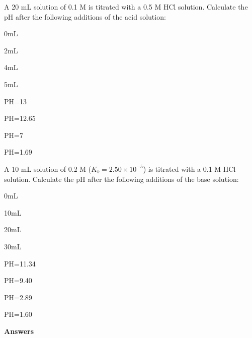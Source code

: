 \documentclass[main.tex]{subfiles}
\begin{document}
\begin{multicols*}{2}
\begin{question}[ID=\the\value{numA}]
A 20 mL solution of 0.1 M  is titrated with a 0.5 M HCl solution. Calculate the pH after the following additions of the acid solution: 
\begin{inparaenum}[(a)]
\item  0mL  	%
\item  2mL		%
\item  4mL		%
\item  5mL		%
 \end{inparaenum}
\end{question}
\begin{solution}
\begin{inparaenum}[(a)]
\item   PH=13
\item   PH=12.65
\item   PH=7
\item   PH=1.69
 \end{inparaenum}
\hspace{0.1cm}\end{solution}%

\begin{question}[ID=\the\value{numA}]
A 10 mL solution of 0.2 M  ($K_b=2.50 \times 10^{-5}$) is titrated with a 0.1 M HCl solution. Calculate the pH after the following additions of the base solution: 
\begin{inparaenum}[(a)]
\item  0mL  	%
\item  10mL	%
\item  20mL	%
\item  30mL	%
 \end{inparaenum}
\end{question}
\begin{solution}
\begin{inparaenum}[(a)]
 \item  PH=11.34 
\item   PH=9.40  
\item   PH=2.89  
\item   PH=1.60 
 \end{inparaenum}
\hspace{0.1cm}\end{solution}%


\end{multicols*}

\newpage
\begin{answersenvironment}
\begin{minipage}[c]{1\textwidth}
\begin{localsize}{10}
{\Large \bf Answers}
  \printsolutions[byID={1,3,5,7,9,11,13,15,17,19,21,23,25,27,29,31,33,35,37}]
\end{localsize}
\end{minipage}\end{answersenvironment}
\end{document}
